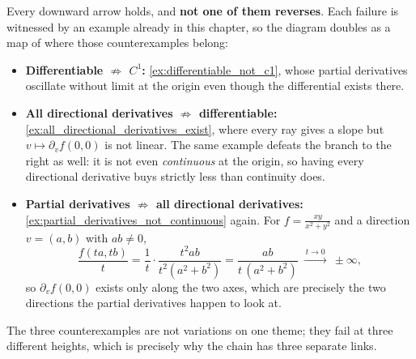\begin{center}
\end{center}

Every downward arrow holds, and \textbf{not one of them reverses}. Each failure is witnessed by an
example already in this chapter, so the diagram doubles as a map of where those counterexamples
belong:
\begin{itemize}
  \item \textbf{Differentiable $\not\Rightarrow$ $C^1$:} \cref{ex:differentiable_not_c1}, whose
    partial derivatives oscillate without limit at the origin even though the differential
    exists there.
  \item \textbf{All directional derivatives $\not\Rightarrow$ differentiable:}
    \cref{ex:all_directional_derivatives_exist}, where every ray gives a slope but
    $v \mapsto \partial_vf(0,0)$ is not linear. The same example defeats the branch to the
    right as well: it is not even \emph{continuous} at the origin, so having every directional
    derivative buys strictly less than continuity does.
  \item \textbf{Partial derivatives $\not\Rightarrow$ all directional derivatives:}
    \cref{ex:partial_derivatives_not_continuous} again. For $f = \tfrac{xy}{x^2+y^2}$ and a
    direction $v = (a,b)$ with $ab \neq 0$,
    \[\frac{f(ta,tb)}{t} = \frac{1}{t}\cdot\frac{t^2ab}{t^2(a^2+b^2)}
      = \frac{ab}{t\,(a^2+b^2)} \ \xrightarrow{\ t \to 0\ }\ \pm\infty,\]
    so $\partial_vf(0,0)$ exists only along the two axes, which are precisely the two directions
    the partial derivatives happen to look at.
\end{itemize}
The three counterexamples are not variations on one theme; they fail at three different
heights, which is precisely why the chain has three separate links.

